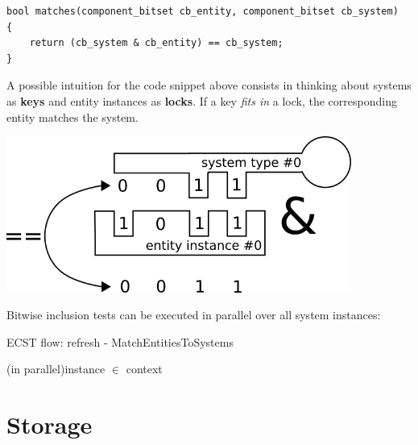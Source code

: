 \documentclass[twoside, 12pt, a4paper, openany]{book}
\let\origfigure=\figure
\let\endorigfigure=\endfigure
\renewenvironment{figure}[1][]{%
\origfigure[H]
}{%
\endorigfigure
}
\begin{document}
\begin{verbatim}
bool matches(component_bitset cb_entity, component_bitset cb_system)
{
    return (cb_system & cb_entity) == cb_system;
}
\end{verbatim}

A possible intuition for the code snippet above consists in thinking
about systems as \textbf{keys} and entity instances as \textbf{locks}.
If a key \emph{fits in} a lock, the corresponding entity matches the
system.

\begin{figure}[htbp]
\centering
\includegraphics[width=0.85000\textwidth]{source/figures/keylock.png}
\caption{ECST flow: key/lock entity/system matching
intuition}\label{keylock}
\end{figure}

Bitwise inclusion tests can be executed in parallel over all system
instances:

\begin{algorithm}[H]

\caption{ECST flow: refresh - MatchEntitiesToSystems}
\footnotesize


    \ForEach(in parallel){instance \I $\in$ context \C}{
    }

\end{algorithm}

\chapter{Storage}\label{storage}
\end{document}

